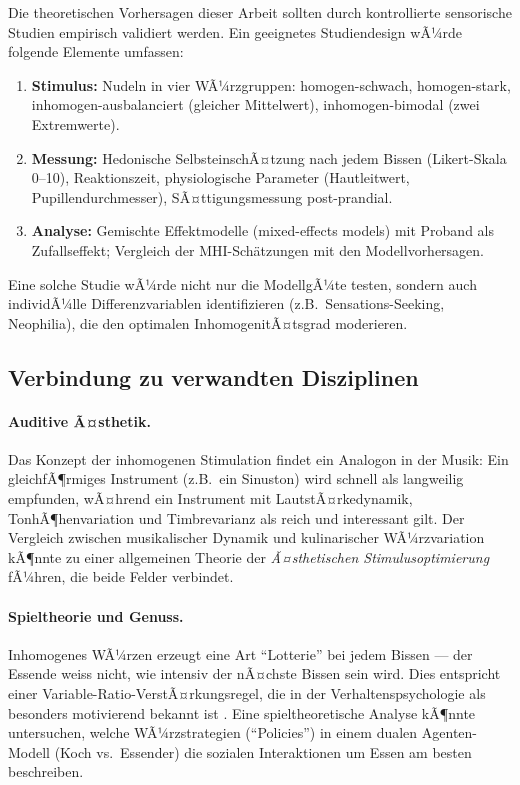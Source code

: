 ﻿\documentclass[12pt,a4paper]{article}
\theoremstyle{definition}
\begin{document}
Die theoretischen Vorhersagen dieser Arbeit sollten durch kontrollierte
sensorische Studien empirisch validiert werden. Ein geeignetes
Studiendesign wÃ¼rde folgende Elemente umfassen:
\begin{enumerate}
  \item \textbf{Stimulus:} Nudeln in vier WÃ¼rzgruppen: homogen-schwach,
    homogen-stark, inhomogen-ausbalanciert (gleicher Mittelwert),
    inhomogen-bimodal (zwei Extremwerte).
  \item \textbf{Messung:} Hedonische SelbsteinschÃ¤tzung nach jedem Bissen
    (Likert-Skala 0--10), Reaktionszeit, physiologische Parameter
    (Hautleitwert, Pupillendurchmesser), SÃ¤ttigungsmessung post-prandial.
  \item \textbf{Analyse:} Gemischte Effektmodelle (mixed-effects models)
    mit Proband als Zufallseffekt; Vergleich der MHI-Sch\"{a}tzungen mit
    den Modellvorhersagen.
\end{enumerate}
Eine solche Studie wÃ¼rde nicht nur die ModellgÃ¼te testen, sondern
auch individÃ¼lle Differenzvariablen identifizieren (z.B.\ Sensations-Seeking,
Neophilia), die den optimalen InhomogenitÃ¤tsgrad moderieren.

\subsection{Verbindung zu verwandten Disziplinen}

\paragraph{Auditive Ã¤sthetik.}
Das Konzept der inhomogenen Stimulation findet ein Analogon in der
Musik: Ein gleichfÃ¶rmiges Instrument (z.B.\ ein Sinuston) wird schnell
als langweilig empfunden, wÃ¤hrend ein Instrument mit LautstÃ¤rkedynamik,
TonhÃ¶henvariation und Timbrevarianz als reich und interessant gilt.
Der Vergleich zwischen musikalischer Dynamik und kulinarischer
WÃ¼rzvariation kÃ¶nnte zu einer allgemeinen Theorie der \emph{Ã¤sthetischen
Stimulusoptimierung} fÃ¼hren, die beide Felder verbindet.

\paragraph{Spieltheorie und Genuss.}
Inhomogenes WÃ¼rzen erzeugt eine Art ``Lotterie'' bei jedem Bissen ---
der Essende weiss nicht, wie intensiv der nÃ¤chste Bissen sein wird.
Dies entspricht einer Variable-Ratio-VerstÃ¤rkungsregel, die in der
Verhaltenspsychologie als besonders motivierend bekannt ist \cite{skinner1938}.
Eine spieltheoretische Analyse kÃ¶nnte untersuchen, welche WÃ¼rzstrategien
(``Policies'') in einem dualen Agenten-Modell (Koch vs.\ Essender) die
sozialen Interaktionen um Essen am besten beschreiben.
\end{document}
